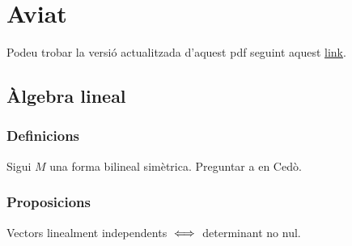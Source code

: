 \documentclass[../Apunts.tex]{subfiles}
\begin{document}
	\chapter{Aviat}
	Podeu trobar la versió actualitzada d'aquest pdf seguint aquest \href{https://claudilleyda.github.io}{link}.
	\section{Àlgebra lineal}
	\subsection{Definicions}
	\begin{definition}
		\label{def:bilineal definida estrictament positiva/negativa}
		Sigui \(M\) una forma bilineal simètrica. Preguntar a en Cedò.
	\end{definition}
	\begin{definition}
		\label{def:Norma d'una aplicació lineal}
	\end{definition}
	\subsection{Proposicions}
	\begin{proposition}\label{prop:determinant diferent de zero linealment independents}
		Vectors linealment independents \(\iff\) determinant no nul.
	\end{proposition}
\end{document}
